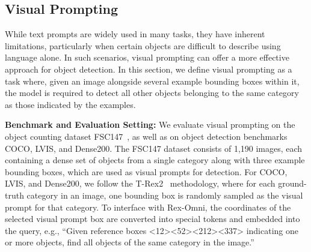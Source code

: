 




\subsection{Visual Prompting}

While text prompts are widely used in many tasks, they have inherent limitations, particularly when certain objects are difficult to describe using language alone. In such scenarios, visual prompting can offer a more effective approach for object detection. In this section, we define visual prompting as a task where, given an image alongside several example bounding boxes within it, the model is required to detect all other objects belonging to the same category as those indicated by the examples.

\textbf{Benchmark and Evaluation Setting:}
We evaluate visual prompting on the object counting dataset FSC147~\cite{ranjan2021learning}, as well as on object detection benchmarks COCO, LVIS, and Dense200. The FSC147 dataset consists of 1,190 images, each containing a dense set of objects from a single category along with three example bounding boxes, which are used as visual prompts for detection. For COCO, LVIS, and Dense200, we follow the T-Rex2~\cite{jiang2024t} methodology, where for each ground-truth category in an image, one bounding box is randomly sampled as the visual prompt for that category. To interface with Rex-Omni, the coordinates of the selected visual prompt box are converted into special tokens and embedded into the query, e.g., “Given reference boxes <12><52><212><337> indicating one or more objects, find all objects of the same category in the image.”


